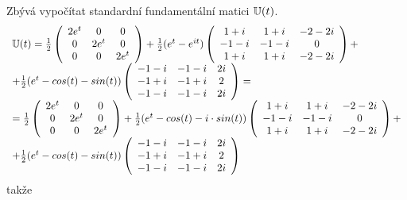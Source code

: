 Zbývá vypočítat standardní fundamentální matici ${\mathbb{U}}(t)$.
\begin{equation*}
 \begin{array}{l}{\mathbb{U}}(t) = \frac{1}{2}\left( \begin{array}{ccc}
      2e^t & 0 & 0\\
      0 & 2e^t & 0\\
      0 & 0 & 2e^t
    \end{array}\right)
    + \frac{1}{2} (e^t - e^{it})\left( \begin{array}{ccc}
      1 + i & 1 + i & -2 - 2i\\
      -1 - i & -1 - i & 0\\
      1 + i & 1 + i & -2 - 2i
    \end{array}\right) + \\
    + \frac{1}{2} (e^t - cos(t) - sin(t))\left( \begin{array}{ccc}
      -1 - i & -1 - i & 2i\\
      -1 + i & -1 + i & 2\\
      -1 - i & -1 - i & 2i
    \end{array}\right) = \\
    = \frac{1}{2}\left( \begin{array}{ccc}
      2e^t & 0 & 0\\
      0 & 2e^t & 0\\
      0 & 0 & 2e^t
    \end{array}\right)
    + \frac{1}{2} (e^t - cos(t) - i\cdot sin(t))\left( \begin{array}{ccc}
      1 + i & 1 + i & -2 - 2i\\
      -1 - i & -1 - i & 0\\
      1 + i & 1 + i & -2 - 2i
    \end{array}\right) + \\
    + \frac{1}{2} (e^t - cos(t) - sin(t))\left( \begin{array}{ccc}
      -1 - i & -1 - i & 2i\\
      -1 + i & -1 + i & 2\\
      -1 - i & -1 - i & 2i
    \end{array}\right)
  \end{array}
\end{equation*}
takže
